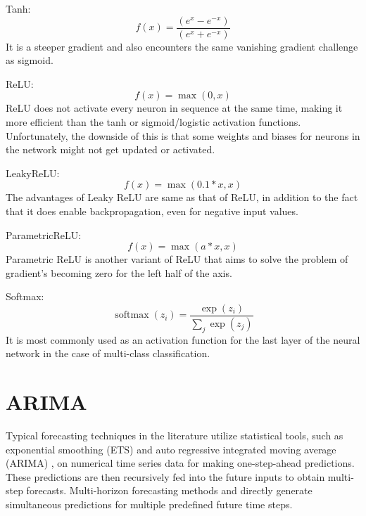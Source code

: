 \bigskip

Tanh:
\begin{equation}
	f(x)=\frac{\left(e^{x}-e^{-x}\right)}{\left(e^{x}+e^{-x}\right)}\label{tanh}
\end{equation}
It is a steeper gradient and also encounters the same vanishing gradient challenge
as sigmoid.

\bigskip

ReLU:
\begin{equation}
	f(x)=\max (0, x) \label{relu}
\end{equation}
ReLU does not activate every neuron in sequence at the same time, making it more
efficient than the tanh or sigmoid/logistic activation functions. Unfortunately,
the downside of this is that some weights and biases for neurons in the network
might not get updated or activated.

\bigskip

LeakyReLU:
\begin{equation}
	f(x)=\max (0.1*x, x) \label{leaky-relu}
\end{equation}
The advantages of Leaky ReLU are same as that of ReLU, in addition to the fact that
it does enable backpropagation, even for negative input values.

\bigskip

ParametricReLU:
\begin{equation}
	f(x)=\max (a*x, x) \label{para-relu}
\end{equation}
Parametric ReLU is another variant of ReLU that aims to solve the problem of
gradient’s becoming zero for the left half of the axis.

\bigskip

Softmax:
\begin{equation}
	\operatorname{softmax}\left(z_{i}\right)=\frac{\exp \left(z_{i}\right)}{\sum_{j}\exp
		\left(z_{j}\right)}\label{softmax}
\end{equation}
It is most commonly used as an activation function for the last layer of the
neural network in the case of multi-class classification.

\section{ARIMA}

Typical forecasting techniques in the literature utilize statistical tools, such
as exponential smoothing (ETS) \cite{gardner1985forecasting} and auto regressive
integrated moving average (ARIMA) \cite{SEMENOGLOU20211072}, on numerical time
series data for making one-step-ahead predictions. These predictions are then recursively
fed into the future inputs to obtain multi-step forecasts. Multi-horizon
forecasting methods \cite{taieb2010forecasting} and
\cite{marcellino2006comparison} directly generate simultaneous predictions for
multiple predefined future time steps.

